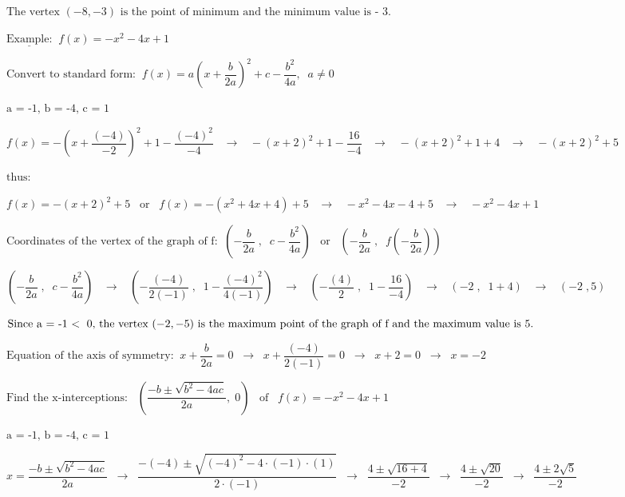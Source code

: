 \documentclass[12pt]{article}
\begin{document}
$\text{The vertex $\left(-8, -3 \right)$ is the point of minimum and the minimum value is - 3.}$

$\underline{\text{Example:}} \;\; f(x) = -x^2 - 4x + 1$

$\text{Convert to standard form:} \;\; f(x) = a\left(x + \dfrac{b}{2a}\right)^2 + c - \dfrac{b^2}{4a}, \;\; a \neq 0$

$\text{a = -1, b = -4, c = 1}$

$f(x) = - \left(x + \dfrac{(-4)}{-2} \right)^2 + 1 - \dfrac{(-4)^2}{-4} \;\;\; \rightarrow \;\;\; - \left(x + 2\right )^2 + 1 - \dfrac{16}{-4} \;\;\; \rightarrow \;\;\; - \left(x + 2\right )^2 + 1 + 4 \;\;\; \rightarrow \;\;\; - \left(x + 2\right )^2 + 5$

$\text{thus:}$

$f(x) = - \left(x + 2\right )^2 + 5 \;\;\; \text{or} \;\;\; f(x) = - \left(x^2 + 4x + 4 \right) + 5 \;\;\; \rightarrow \;\;\; -x^2 - 4x - 4 + 5 \;\;\; \rightarrow \;\;\; -x^2 - 4x + 1$

$\text{Coordinates of the vertex of the graph of f:} \;\; \left(-\dfrac{b}{2a}\;, \;\; c - \dfrac{b^2}{4a} \right) \;\;\; \text{or} \;\;\; \left(-\dfrac{b}{2a}\;, \;\; f\left(-\dfrac{b}{2a}\right) \right)$

$\left(-\dfrac{b}{2a}\;, \;\; c - \dfrac{b^2}{4a} \right) \;\;\; \rightarrow \;\;\; \left(-\dfrac{(-4)}{2(-1)}\;, \;\; 1 - \dfrac{(-4)^2}{4(-1)} \right) \;\;\; \rightarrow \;\;\; \left(-\dfrac{(4)}{2}\;, \;\; 1 - \dfrac{16}{-4} \right) \;\;\; \rightarrow \;\;\; \left(-2 \;, \;\; 1 + 4 \right) \;\;\; \rightarrow \;\;\; \left(-2 \;, 5 \right)$

$\text{Since a = -1 $<$ \;0, the vertex $\left(-2, -5 \right)$ is the maximum point of the graph of f and the maximum value is 5.}$

$\text{Equation of the axis of symmetry:} \;\; x + \dfrac{b}{2a} = 0 \;\; \rightarrow \;\; x + \dfrac{(-4)}{2(-1)} = 0 \;\; \rightarrow \;\; x + 2 = 0 \;\; \rightarrow \;\; x = -2$

$\text{Find the x-interceptions:} \;\;\; \left(\dfrac{-b \pm \sqrt{b^2 - 4ac}}{2a},\; 0 \right) \;\;\; \text{of} \;\;\; f(x) = -x^2 - 4x + 1$

$\text{a = -1, b = -4, c = 1}$

$x = \dfrac{-b \pm \sqrt{b^2 - 4ac}}{2a} \;\; \rightarrow \;\; \dfrac{-(-4) \pm \sqrt{(-4)^2 - 4 \cdot (-1) \cdot (1)}}{2 \cdot (-1)} \;\; \rightarrow \;\; \dfrac{4 \pm \sqrt{16 + 4}}{-2} \;\; \rightarrow \;\; \dfrac{4 \pm \sqrt{20}}{-2} \;\; \rightarrow \;\; \dfrac{4 \pm 2\sqrt{5}}{-2}$
\end{document}
